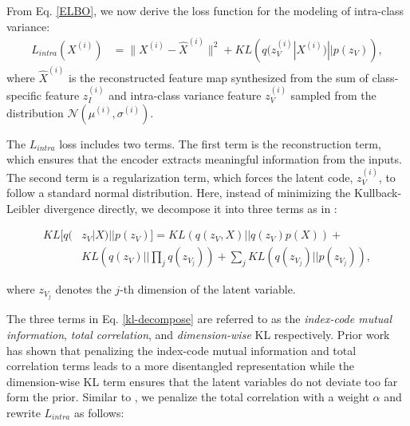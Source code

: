 \documentclass[10pt,twocolumn,letterpaper]{article}
\begin{document}
      From Eq. \ref{ELBO}, we now derive the loss function for the modeling of intra-class variance:
      \small
      \begin{equation} \label{intra-class-2}
      \begin{aligned}
        L_{intra}(X^{(i)}) &= \| X^{(i)} - \hat{X}^{(i)} \|^2 + KL\left(q(z_V^{(i)}|X^{(i)})||p(z_V)\right),
      \end{aligned}
      \end{equation}
\normalsize
      where $\hat{X}^{(i)}$ is the reconstructed feature map synthesized from the sum of class-specific feature $z_I^{(i)}$
      and intra-class variance feature $z_V^{(i)}$ sampled from the distribution $\mathcal{N}(\mu^{(i)}, \sigma^{(i)})$.      
      
      The $L_{intra}$ loss includes two terms.
The first term is the reconstruction term, which ensures that the encoder extracts meaningful information from the inputs.
The second term is a regularization term, which forces the latent code, $z_V^{(i)}$, to follow a standard normal distribution.
Here, instead of minimizing the Kullback-Leibler divergence directly, we decompose it into three terms as in \cite{beta-tv-vae}:
      
      \footnotesize
      \begin{equation}
      \begin{split} \label{kl-decompose}
       KL[q(&z_{V}|X)||p(z_{V})] = KL\left( q(z_{V},X)||q(z_{V})p(X) \right) + \\ &KL( q(z_{V})||\prod_{j}q(z_{V_j})) + \sum_{j}KL(q(z_{V_j})||p(z_{V_j})),
      \end{split}
      \end{equation}
      
      \normalsize
      \noindent where $z_{V_j}$ denotes the $j$-th dimension of the latent variable.
      
      The three terms in Eq. \ref{kl-decompose} are referred to as the \textit{index-code mutual information}, \textit{total correlation}, and \textit{dimension-wise} KL respectively.
Prior work \cite{beta-tv-vae,Achille2018,Burgess2018UnderstandingDI} has shown that penalizing the index-code mutual information and total correlation terms leads to a more disentangled representation while the dimension-wise KL term ensures that the latent variables do not deviate too far form the prior. Similar to \cite{beta-tv-vae}, we penalize the total correlation with a weight \(\alpha\)
      and rewrite $L_{intra}$  as follows:
      
\end{document}
